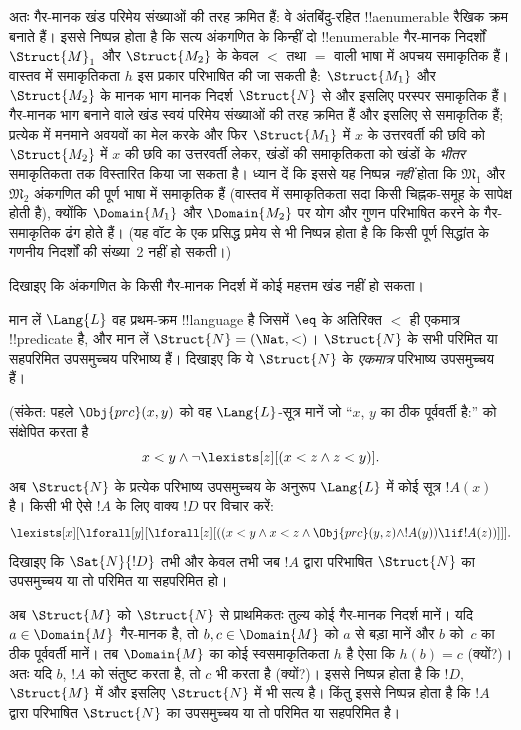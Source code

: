 \documentclass[../../../include/open-logic-section]{subfiles}
\begin{document}
अतः गैर-मानक खंड परिमेय संख्याओं की तरह क्रमित हैं: वे अंतबिंदु-रहित
!!a{enumerable} रैखिक क्रम बनाते हैं। इससे निष्पन्न होता है
कि सत्य अंकगणित के किन्हीं दो !!{enumerable} गैर-मानक निदर्शों $\Struct{M}_1$ और
$\Struct{M_2}$ के केवल $<$ तथा $=$ वाली भाषा में अपचय समाकृतिक हैं। वास्तव
में समाकृतिकता $h$ इस प्रकार परिभाषित की जा सकती है: $\Struct{M_1}$ और
$\Struct{M_2}$ के मानक भाग मानक निदर्श $\Struct{N}$ से और इसलिए परस्पर
समाकृतिक हैं। गैर-मानक भाग बनाने वाले खंड स्वयं
परिमेय संख्याओं की तरह क्रमित हैं और इसलिए  से
समाकृतिक हैं; प्रत्येक में मनमाने अवयवों का मेल करके और फिर $\Struct{M_1}$
में $x$ के उत्तरवर्ती की छवि को $\Struct{M_2}$ में $x$ की छवि का उत्तरवर्ती
लेकर, खंडों की समाकृतिकता को खंडों के \emph{भीतर} समाकृतिकता तक विस्तारित
किया जा सकता है। ध्यान दें कि इससे यह निष्पन्न \emph{नहीं} होता कि
$\mathfrak{M}_1$ और $\mathfrak{M}_2$ अंकगणित की पूर्ण भाषा में समाकृतिक हैं
(वास्तव में समाकृतिकता सदा किसी चिह्नक-समूह के सापेक्ष होती है), क्योंकि
$\Domain{M_1}$ और $\Domain{M_2}$ पर योग और गुणन परिभाषित करने के
गैर-समाकृतिक ढंग होते हैं। (यह वॉट के एक प्रसिद्ध प्रमेय से भी निष्पन्न होता
है कि किसी पूर्ण सिद्धांत के गणनीय निदर्शों की संख्या~2 नहीं हो सकती।)

\begin{prob}
दिखाइए कि अंकगणित के किसी गैर-मानक निदर्श में कोई महत्तम खंड नहीं हो सकता।
\end{prob}

\begin{prob} 
मान लें $\Lang{L}$ वह प्रथम-क्रम !!{language} है जिसमें $\eq$ के अतिरिक्त
$<$ ही एकमात्र !!{predicate} है, और मान लें $\Struct{N} = (\Nat, <)$।
$\Struct{N}$ के सभी परिमित या सहपरिमित उपसमुच्चय परिभाष्य हैं। दिखाइए कि ये
$\Struct{N}$ के \emph{एकमात्र} परिभाष्य उपसमुच्चय हैं।
 
(संकेत: पहले $\Obj{prc}(x,y)$ को वह $\Lang{L}$-सूत्र मानें जो ``$x$, $y$
का ठीक पूर्ववर्ती है:'' को संक्षेपित करता है
\[
x<y \land \lnot \lexists[z][(x<z \land z < y)].
\]
अब $\Struct{N}$ के प्रत्येक परिभाष्य उपसमुच्चय के अनुरूप $\Lang{L}$ में कोई
सूत्र $!A(x)$ है। किसी भी ऐसे $!A$ के लिए वाक्य $!D$ पर विचार करें:
\[
\lexists[x][\lforall[y][\lforall[z][((x<y \land x<z \land \Obj{prc}(y,z)
  \land !A(y)) \lif !A(z))]]].
\]
दिखाइए कि $\Sat{N}{!D}$ तभी और केवल तभी जब $!A$ द्वारा परिभाषित
$\Struct{N}$ का उपसमुच्चय या तो परिमित या सहपरिमित हो।

अब $\Struct{M}$ को $\Struct{N}$ से प्राथमिकतः तुल्य कोई गैर-मानक निदर्श
मानें। यदि $a \in \Domain{M}$ गैर-मानक है, तो $b, c \in \Domain{M}$ को
$a$ से बड़ा मानें और $b$ को~$c$ का ठीक पूर्ववर्ती मानें। तब $\Domain{M}$
का कोई स्वसमाकृतिकता $h$ है ऐसा कि $h(b)=c$ (क्यों?)। अतः यदि $b$, $!A$ को
संतुष्ट करता है, तो $c$ भी करता है (क्यों?)। इससे निष्पन्न होता है कि $!D$,
$\Struct{M}$ में और इसलिए $\Struct{N}$ में भी सत्य है। किंतु इससे निष्पन्न
होता है कि $!A$ द्वारा परिभाषित $\Struct{N}$ का उपसमुच्चय या तो परिमित या
सहपरिमित है।
\end{prob}
\end{document}
